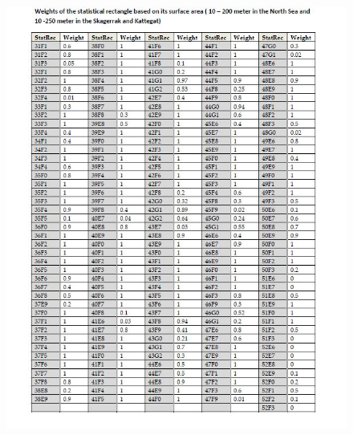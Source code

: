 \documentclass[a4paper 12pt]{article}
\numberwithin{equation}{section}
\begin{document}
\begin{appendices}
\begin{figure}[h!]
  \centering
 {\includegraphics[width=17.5cm]{recWeightings.jpg}}   
 \captionsetup{font= footnotesize, width=15cm}{
 \caption{}\label{weightings11}}
\end{figure}

\clearpage



\end{appendices}
\end{document}
